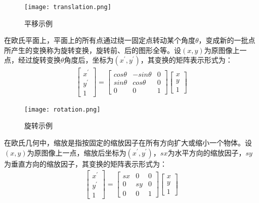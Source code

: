    \begin{figure}[ht!]
   \centering
  \texttt{[image: translation.png]}
  \caption{平移示例}
 \end{figure}

在欧氏平面上，平面上的所有点通过绕一固定点转动某个角度$\theta$，变成新的一批点所产生的变换称为旋转变换，旋转前、后的图形全等。设$(x,y)$为原图像上一点，经过旋转变换$\theta$角度后，坐标为$(x^{'},y^{'})$，其变换的矩阵表示形式为：
\begin{align}
\left[ \begin{array}{c}
x^{'} \\
y^{'}\\
1   
\end{array} \right]
=
\left[ \begin{array}{ccc}
cos\theta & -sin\theta & 0 \\
sin\theta & cos\theta & 0 \\
0 & 0 & 1
\end{array} \right]
\left[ \begin{array}{c}
x\\
y \\
1
\end{array} \right]
\end{align}

   \begin{figure}[ht!]
   \centering
  \texttt{[image: rotation.png]}
  \caption{旋转示例}
 \end{figure}
 
 在欧氏几何中，缩放是指按固定的缩放因子在所有方向扩大或缩小一个物体。设$(x,y)$为原图像上一点，缩放后坐标为$(x^{'},y^{'})$，$sx$为水平方向的缩放因子，$sy$为垂直方向的缩放因子，其变换的矩阵表示形式为：
 \begin{align}
\left[ \begin{array}{c}
x^{'} \\
y^{'}\\
1   
\end{array} \right]
=
\left[ \begin{array}{ccc}
sx & 0 & 0 \\
0 & sy & 0 \\
0 & 0 & 1
\end{array} \right]
\left[ \begin{array}{c}
x \\
y\\
1
\end{array} \right]
\end{align}

